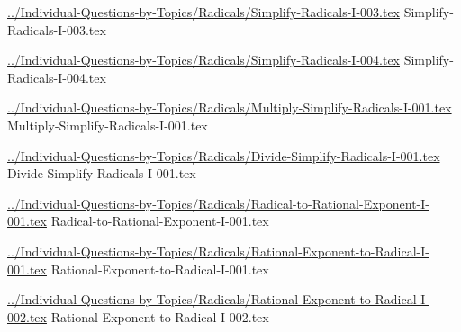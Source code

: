 \documentclass[answer,cancelspace,12pt]{exam}
\begin{document}
\begin{questions}
\question
\href{../Individual-Questions-by-Topics/Radicals/Simplify-Radicals-I-003.tex}{../Individual-Questions-by-Topics/Radicals/Simplify-Radicals-I-003.tex}
{Simplify-Radicals-I-003.tex}


\question
\href{../Individual-Questions-by-Topics/Radicals/Simplify-Radicals-I-004.tex}{../Individual-Questions-by-Topics/Radicals/Simplify-Radicals-I-004.tex}
{Simplify-Radicals-I-004.tex}


\question
\href{../Individual-Questions-by-Topics/Radicals/Multiply-Simplify-Radicals-I-001.tex}{../Individual-Questions-by-Topics/Radicals/Multiply-Simplify-Radicals-I-001.tex}
{Multiply-Simplify-Radicals-I-001.tex}


\question
\href{../Individual-Questions-by-Topics/Radicals/Divide-Simplify-Radicals-I-001.tex}{../Individual-Questions-by-Topics/Radicals/Divide-Simplify-Radicals-I-001.tex}
{Divide-Simplify-Radicals-I-001.tex}




\question
\href{../Individual-Questions-by-Topics/Radicals/Radical-to-Rational-Exponent-I-001.tex}{../Individual-Questions-by-Topics/Radicals/Radical-to-Rational-Exponent-I-001.tex}
{Radical-to-Rational-Exponent-I-001.tex}


\question
\href{../Individual-Questions-by-Topics/Radicals/Rational-Exponent-to-Radical-I-001.tex}{../Individual-Questions-by-Topics/Radicals/Rational-Exponent-to-Radical-I-001.tex}
{Rational-Exponent-to-Radical-I-001.tex}


\question
\href{../Individual-Questions-by-Topics/Radicals/Rational-Exponent-to-Radical-I-002.tex}{../Individual-Questions-by-Topics/Radicals/Rational-Exponent-to-Radical-I-002.tex}
{Rational-Exponent-to-Radical-I-002.tex}



\end{questions}
\end{document}
